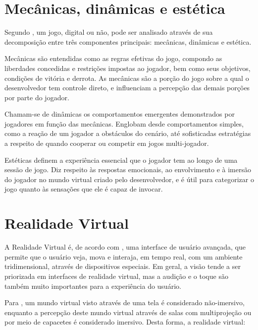 
\section{Mecânicas, dinâmicas e estética}\label{sec-mecanica-dinamica-estetica}

Segundo \cite{hunicke:2004}, um jogo, digital ou não, pode ser analisado através de
sua decomposição entre três componentes principais: mecânicas, dinâmicas e estética.

Mecânicas são entendidas como as regras efetivas do jogo, compondo as liberdades
concedidas e restrições impostas ao jogador, bem como seus objetivos, condições de
vitória e derrota. As mecânicas são a porção do jogo sobre a qual o desenvolvedor tem
controle direto, e influenciam a percepção das demais porções por parte do jogador.

Chamam-se de dinâmicas os comportamentos emergentes demonstrados por jogadores em 
função das mecânicas. Englobam desde comportamentos simples, como a reação de um
jogador a obstáculos do cenário, até sofisticadas estratégias a respeito de quando
cooperar ou competir em jogos multi-jogador.

Estéticas definem a experiência essencial que o jogador tem ao longo de uma sessão de
jogo. Diz respeito às respostas emocionais, ao envolvimento e à imersão do jogador no
mundo virtual criado pelo desenvolvedor, e é útil para categorizar o jogo quanto às
sensações que ele é capaz de invocar.


\section{Realidade Virtual}\label{sec-realidadevirtual}

A Realidade Virtual é, de acordo com \cite{kirner:2007:RV_e_RA}, uma interface de
usuário avançada, que permite que o usuário veja, mova e interaja, em tempo real, 
com um ambiente tridimensional, através de dispositivos especiais. Em geral, a visão
tende a ser priorizada em interfaces de realidade virtual, mas a audição e o toque 
são também muito importantes para a experiência do usuário.

Para \cite{kirner:2011:evolucao_RV}, um mundo virtual visto através de uma tela é
considerado não-imersivo, enquanto a percepção deste mundo virtual através de salas 
com multiprojeção ou por meio de capacetes é considerado imersivo. Desta forma, a
realidade virtual:

